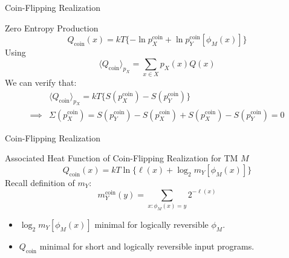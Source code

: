 \begin{frame}{Coin-Flipping Realization}
    \begin{block}{Zero Entropy Production}
    \begin{equation*}
        Q_\text{coin}(x) = kT\{-\ln p_X^\text{coin} + \ln p_Y^\text{coin}[\phi_M(x)]\}
    \end{equation*}
    Using 
    \begin{equation*}
        \langle Q_\text{coin} \rangle_{p_X}=\sum_{x\in X}p_X(x)Q(x)
    \end{equation*}
    We can verify that:
    \begin{align*}
        &\langle Q_\text{coin}\rangle_{p_X} = kT\{ S(p_X^\text{coin}) - S(p_Y^\text{coin})\}\\
        \implies &\Sigma(p_X^\text{coin}) = S(p_Y^\text{coin}) - S(p_X^\text{coin}) + S(p_X^\text{coin}) - S(p_Y^\text{coin}) = 0
    \end{align*}
    \end{block}
\end{frame}

\begin{frame}{Coin-Flipping Realization}
\begin{block}{Associated Heat Function of Coin-Flipping Realization for TM $M$}
\begin{equation*}
    Q_\text{coin}(x) = kT\ln \{\ell(x) + \log_2 m_Y[\phi_M(x)]\}
\end{equation*}
Recall definition of $m_Y$:
\begin{equation*}
        m_Y^\text{coin}(y) = \sum_{x:\phi_M(x) = y} 2^{-\ell(x)}
    \end{equation*}
\begin{itemize}
    \item $\log_2 m_Y[\phi_M(x)]$ minimal for logically reversible $\phi_M$.
    \item $Q_\text{coin}$ minimal for short and logically reversible input programs.
\end{itemize}
\end{block}
\end{frame}

